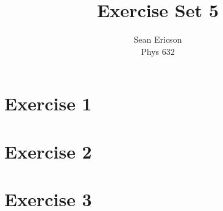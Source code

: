 \documentclass[12pt]{article}
\begin{document}
	
\title{Exercise Set 5}
\author{Sean Ericson \\ Phys 632}
\maketitle

\section*{Exercise 1}



\section*{Exercise 2}



\section*{Exercise 3}
\end{document}
